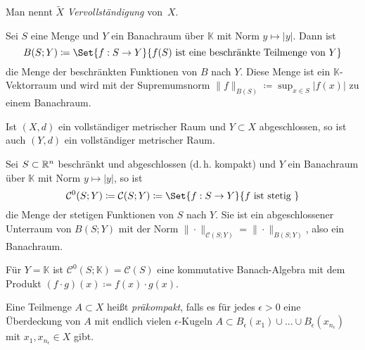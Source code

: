 \documentclass{cheat-sheet}
\newcommand{\K}{\mathbb{K}}
\begin{document}
\begin{defn}
  Man nennt $\widetilde{X}$ \emph{Vervollständigung} von~$X$.
\end{defn}


















\begin{defn}
  Sei $S$ eine Menge und $Y$ ein Banachraum über $\K$ mit Norm $y \mapsto |y|$. Dann ist
  \[ B(S; Y) \coloneqq \Set{ f : S \to Y }{ f(S) \text { ist eine beschränkte Teilmenge von } Y } \]
  die Menge der beschränkten Funktionen von $B$ nach $Y$. Diese Menge ist ein $\K$-Vektorraum und wird mit der Supremumsnorm $\| f \|_{B(S)} \coloneqq \sup_{x \in S} |f(x)|$ zu einem Banachraum.
\end{defn}

\begin{satz}
  Ist $(X, d)$ ein vollständiger metrischer Raum und $Y \subset X$ abgeschlossen, so ist auch $(Y, d)$ ein vollständiger metrischer Raum.
\end{satz}

\begin{defn}
  Sei $S \subset \mathbb{R}^n$ beschränkt und abgeschlossen (d.\,h. kompakt) und $Y$ ein Banachraum über $\K$ mit Norm $y \mapsto |y|$, so ist
  \[ \mathcal{C}^0(S; Y) \coloneqq \mathcal{C}(S; Y) \coloneqq \Set{ f : S \to Y }{ f \text{ ist stetig } } \]
  die Menge der stetigen Funktionen von $S$ nach $Y$. Sie ist ein abgeschlossener Unterraum von $B(S; Y)$ mit der Norm $\| \cdot \|_{\mathcal{C}(S; Y)} = \| \cdot \|_{B(S; Y)}$, also ein Banachraum.
\end{defn}

\begin{bem}
  Für $Y = \K$ ist $\mathcal{C}^0(S; \K) = \mathcal{C}(S)$ eine kommutative Banach-Algebra mit dem Produkt $(f \cdot g)(x) \coloneqq f(x) \cdot g(x)$.
\end{bem}

\begin{defn}
  Eine Teilmenge $A \subset X$ heißt \emph{präkompakt}, falls es für jedes $\epsilon > 0$ eine Überdeckung von $A$ mit endlich vielen $\epsilon$-Kugeln $A \subset B_{\epsilon}(x_1) \cup ... \cup B_{\epsilon}(x_{n_\epsilon})$ mit $x_1, x_{n_\epsilon} \in X$ gibt.
\end{defn}
\end{document}
